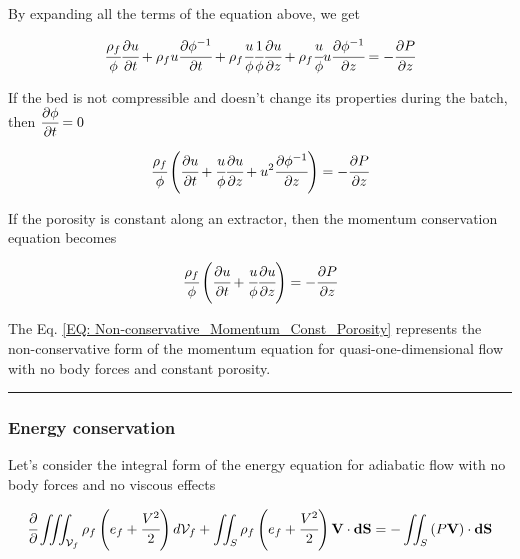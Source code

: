 \documentclass[../Article_Model_Parameters.tex]{subfiles}
\begin{document}
	By expanding all the terms of the equation above, we get
	
	{\footnotesize
		\begin{equation}
			\cfrac{\rho_f}{\phi} \cfrac{\partial u}{\partial t} + \rho_f u \cfrac{\partial \phi^{-1}}{\partial t} + \rho_f \cfrac{u}{\phi} \cfrac{1}{\phi} \cfrac{\partial u}{\partial z} + \rho_f \cfrac{u}{\phi} u \cfrac{\partial \phi^{-1} }{\partial z} = - \cfrac{\partial P}{\partial z}
		\end{equation}
	}
	
	If the bed is not compressible and doesn't change its properties during the batch, then ${\footnotesize\cfrac{\partial \phi}{\partial t}=0}$
	
	{\footnotesize
		\begin{equation}
			\cfrac{\rho_f}{\phi} \left( \cfrac{\partial u}{\partial t} + \cfrac{u}{\phi} \cfrac{\partial u}{\partial z} + u^2 \cfrac{\partial \phi^{-1}}{\partial z} \right) = -\cfrac{\partial P}{\partial z}
		\end{equation}
	}

	If the porosity is constant along an extractor, then the momentum conservation equation becomes
	
	{\footnotesize
		\begin{equation}
			\cfrac{\rho_f}{\phi} \left( \cfrac{\partial u}{\partial t} + \cfrac{u}{\phi} \cfrac{\partial u}{\partial z} \right) = -\cfrac{\partial P}{\partial z}
			\label{EQ: Non-conservative_Momentum_Const_Porosity}
		\end{equation}
	}

	The Eq. \ref{EQ: Non-conservative_Momentum_Const_Porosity} represents the non-conservative form of the momentum equation for quasi-one-dimensional flow with no body forces and constant porosity.
	
	\hrule
	
	\subsubsection{Energy conservation}
	
	Let's consider the integral form of the energy equation for adiabatic flow with no body forces and no viscous effects
	
	{\footnotesize
		\begin{equation}
			\cfrac{\partial}{\partial} \iiint_{\mathcal{V}_f} \rho_f \left( e_f + \cfrac{V^2}{2} \right) d\mathcal{V}_f + \iint_S \rho_f \left( e_f + \cfrac{V^2}{2} \right) \textbf{V} \cdot \textbf{dS} = - \iint_S \left( P\textbf{V} \right) \cdot \textbf{dS}
			\label{EQ: Energy_equation_integral}
		\end{equation}
	}
\end{document}
